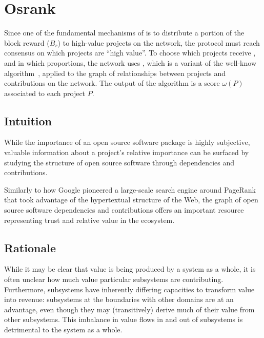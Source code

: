 \section{Osrank}
\label{s:osrank}

\def\Graph{\mathsf{Graph}}
\def\proj{\mathsf{project}}
\def\contributor{\mathsf{account}}
\def\dep{\mathsf{depend}}
\def\own{\mathsf{maintain}}
\def\coown{\mathsf{maintain}^\circ}
\def\contrib{\mathsf{contrib}}
\def\cocontrib{\mathsf{contrib}^\circ}

Since one of the fundamental mechanisms of \oscoin{} is to distribute a portion
of the block reward ($B_r$) to high-value projects on the network, the protocol
must reach consensus on which projects are ``high value''. To choose which
projects receive \oscoin{}, and in which proportions, the network uses
\osrank{}, which is a variant of the well-know \pagerank{}
algorithm~\cite{pagerank}, applied to the graph of relationships between
projects and contributions on the network. The output of the \osrank{} algorithm is a score
$\omega(P)$ associated to each project $P$.

\subsection{Intuition}

While the importance of an open source software package is highly subjective,
valuable information about a project's relative importance can be surfaced by
studying the structure of open source software through dependencies and
contributions.

Similarly to how Google pioneered a large-scale search engine around PageRank
that took advantage of the hypertextual structure of the Web, the graph of open
source software dependencies and contributions offers an important resource
representing trust and relative value in the ecosystem.

\subsection{Rationale}

While it may be clear that value is being produced by a system as a whole, it is
often unclear how much value particular subsystems are
contributing. Furthermore, subsystems have inherently differing capacities to
transform value into revenue: subsystems at the boundaries with other domains
are at an advantage, even though they may (transitively) derive much of their
value from other subsystems. This imbalance in value flows in and out of
subsystems is detrimental to the system as a whole.


